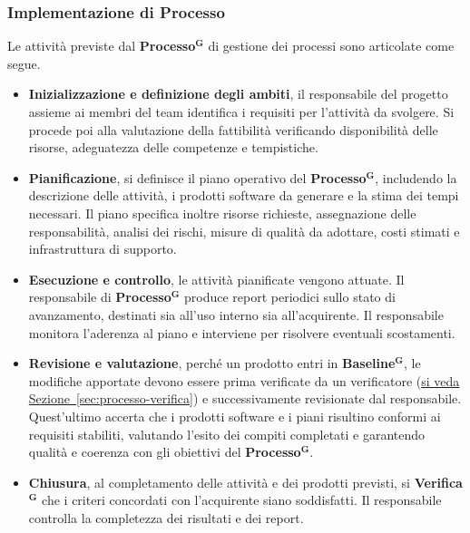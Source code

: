 \documentclass[a4paper,12pt]{article}
\newcommand{\term}[1]{\textbf{#1}$^\mathbf{G}$}
\begin{document}
\subsubsection{Implementazione di Processo}
Le attività previste dal \term{Processo} di gestione dei processi sono articolate come segue.
\begin{itemize}
    \item \textbf{Inizializzazione e definizione degli ambiti}, il responsabile del progetto assieme ai membri del team identifica i requisiti per l'attività da svolgere. Si procede poi alla valutazione della fattibilità verificando disponibilità delle risorse, adeguatezza delle competenze e tempistiche.
    \item \textbf{Pianificazione}, si definisce il piano operativo del \term{Processo}, includendo la descrizione delle attività, i prodotti software da generare e la stima dei tempi necessari. Il piano specifica inoltre risorse richieste, assegnazione delle responsabilità, analisi dei rischi, misure di qualità da adottare, costi stimati e infrastruttura di supporto.
    \item \textbf{Esecuzione e controllo}, le attività pianificate vengono attuate. Il responsabile di \term{Processo} produce report periodici sullo stato di avanzamento, destinati sia all’uso interno sia all’acquirente. Il responsabile monitora l’aderenza al piano e interviene per risolvere eventuali scostamenti.
    \item \textbf{Revisione e valutazione}, perché un prodotto entri in \term{Baseline}, le modifiche apportate devono essere prima verificate da un verificatore (\hyperref[sec:processo-verifica]{si veda Sezione~\ref*{sec:processo-verifica}}) e successivamente revisionate dal responsabile. Quest’ultimo accerta che i prodotti software e i piani risultino conformi ai requisiti stabiliti, valutando l’esito dei compiti completati e garantendo qualità e coerenza con gli obiettivi del \term{Processo}.
    \item \textbf{Chiusura}, al completamento delle attività e dei prodotti previsti, si \term{Verifica} che i criteri concordati con l’acquirente siano soddisfatti. Il responsabile controlla la completezza dei risultati e dei report.
\end{itemize}
\end{document}

